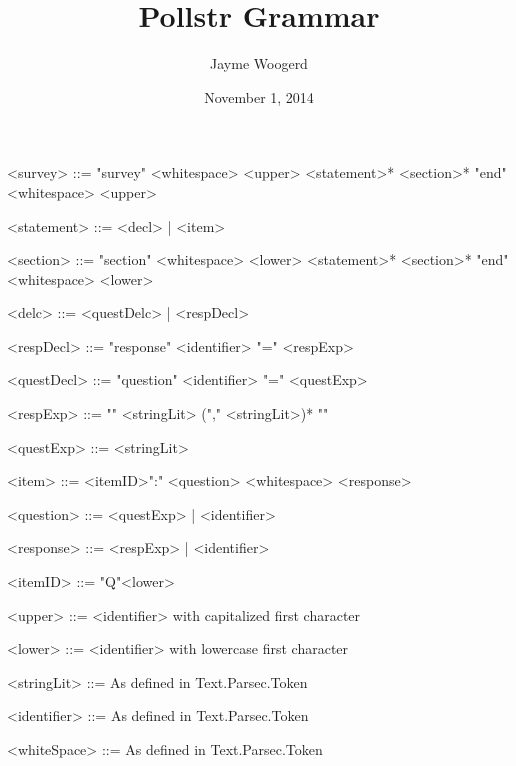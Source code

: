 \documentclass{article}
\title{Pollstr Grammar}
\author{Jayme Woogerd}
\date{November 1, 2014}
\begin{document}
\maketitle
\thispagestyle{empty}

\begin{grammar}

    <survey>     ::= "survey"  <whitespace> <upper> <statement>* <section>* "end" <whitespace> <upper>

    <statement>  ::= <decl> | <item>

    <section>    ::= "section" <whitespace> <lower> <statement>* <section>* "end" <whitespace> <lower>

    <delc>       ::= <questDelc> | <respDecl>

    <respDecl>   ::= "response" <identifier> "=" <respExp>

    <questDecl>  ::= "question" <identifier> "=" <questExp>

    <respExp>    ::= "{" <stringLit> ("," <stringLit>)* "}"

    <questExp>   ::= <stringLit>

    <item>       ::= <itemID>":" <question> <whitespace> <response>

    <question>   ::= <questExp> | <identifier>

    <response>   ::= <respExp> | <identifier>

    <itemID>     ::= "Q"<lower>

    <upper> ::= <identifier> with capitalized first character
    
    <lower>      ::= <identifier> with lowercase first character

    <stringLit>  ::= As defined in Text.Parsec.Token

    <identifier> ::= As defined in Text.Parsec.Token

    <whiteSpace> ::= As defined in Text.Parsec.Token


\end{grammar}
\end{document}

